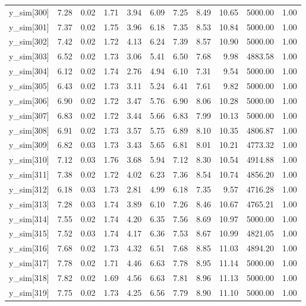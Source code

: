 \begin{table}[ht]
\begin{tabular}{rrrrrrrrrrr}
  y\_sim[300] & 7.28 & 0.02 & 1.71 & 3.94 & 6.09 & 7.25 & 8.49 & 10.65 & 5000.00 & 1.00 \\ 
  y\_sim[301] & 7.37 & 0.02 & 1.75 & 3.96 & 6.18 & 7.35 & 8.53 & 10.84 & 5000.00 & 1.00 \\ 
  y\_sim[302] & 7.42 & 0.02 & 1.72 & 4.13 & 6.24 & 7.39 & 8.57 & 10.90 & 5000.00 & 1.00 \\ 
  y\_sim[303] & 6.52 & 0.02 & 1.73 & 3.06 & 5.41 & 6.50 & 7.68 & 9.98 & 4883.58 & 1.00 \\ 
  y\_sim[304] & 6.12 & 0.02 & 1.74 & 2.76 & 4.94 & 6.10 & 7.31 & 9.54 & 5000.00 & 1.00 \\ 
  y\_sim[305] & 6.43 & 0.02 & 1.73 & 3.11 & 5.24 & 6.41 & 7.61 & 9.82 & 5000.00 & 1.00 \\ 
  y\_sim[306] & 6.90 & 0.02 & 1.72 & 3.47 & 5.76 & 6.90 & 8.06 & 10.28 & 5000.00 & 1.00 \\ 
  y\_sim[307] & 6.83 & 0.02 & 1.72 & 3.44 & 5.66 & 6.83 & 7.99 & 10.13 & 5000.00 & 1.00 \\ 
  y\_sim[308] & 6.91 & 0.02 & 1.73 & 3.57 & 5.75 & 6.89 & 8.10 & 10.35 & 4806.87 & 1.00 \\ 
  y\_sim[309] & 6.82 & 0.03 & 1.73 & 3.43 & 5.65 & 6.81 & 8.01 & 10.21 & 4773.32 & 1.00 \\ 
  y\_sim[310] & 7.12 & 0.03 & 1.76 & 3.68 & 5.94 & 7.12 & 8.30 & 10.54 & 4914.88 & 1.00 \\ 
  y\_sim[311] & 7.38 & 0.02 & 1.72 & 4.02 & 6.23 & 7.36 & 8.54 & 10.74 & 4856.20 & 1.00 \\ 
  y\_sim[312] & 6.18 & 0.03 & 1.73 & 2.81 & 4.99 & 6.18 & 7.35 & 9.57 & 4716.28 & 1.00 \\ 
  y\_sim[313] & 7.28 & 0.03 & 1.74 & 3.89 & 6.10 & 7.26 & 8.46 & 10.67 & 4765.21 & 1.00 \\ 
  y\_sim[314] & 7.55 & 0.02 & 1.74 & 4.20 & 6.35 & 7.56 & 8.69 & 10.97 & 5000.00 & 1.00 \\ 
  y\_sim[315] & 7.52 & 0.03 & 1.74 & 4.17 & 6.36 & 7.53 & 8.67 & 10.99 & 4821.05 & 1.00 \\ 
  y\_sim[316] & 7.68 & 0.02 & 1.73 & 4.32 & 6.51 & 7.68 & 8.85 & 11.03 & 4894.20 & 1.00 \\ 
  y\_sim[317] & 7.78 & 0.02 & 1.71 & 4.46 & 6.63 & 7.78 & 8.95 & 11.14 & 5000.00 & 1.00 \\ 
  y\_sim[318] & 7.82 & 0.02 & 1.69 & 4.56 & 6.63 & 7.81 & 8.96 & 11.13 & 5000.00 & 1.00 \\ 
  y\_sim[319] & 7.75 & 0.02 & 1.73 & 4.25 & 6.56 & 7.79 & 8.90 & 11.10 & 5000.00 & 1.00 \\ 

\end{tabular}
\end{table}
